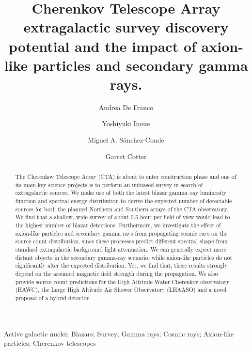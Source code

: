 \documentclass[final,5p]{elsarticle}
\begin{document}
\begin{frontmatter}

\title{Cherenkov Telescope Array extragalactic survey discovery potential and the impact of axion-like particles and secondary gamma rays.}

\author[rvt]{Andrea De Franco}
\author[focal]{Yoshiyuki Inoue}
\author[els]{Miguel A. S\'anchez-Conde}
\author[rvt]{Garret Cotter}
\address[rvt]{University of Oxford, department of Astrophysics, Parks Road,Oxford,UK}
\address[focal]{Institute of Space and Astronautical Science JAXA, 3-1-1 Yoshinodai, Chuo-ku, Sagamihara, Kanagawa 252-5210, Japan}
\address[els]{Oskar Klein Centre for Cosmoparticle Physics, Department of Physics, Stockholm University, SE-10691 Stockholm, Sweden}
\address[els]{Instituto de F\'{\i}sica Te\'orica UAM/CSIC, Universidad Aut\'onoma de Madrid, E-28049 Madrid, Spain}
\address[els]{Departamento de F\'isica Te\'orica, M-15, Universidad Aut\'onoma de Madrid, E-28049 Madrid, Spain}




\begin{abstract}
The Cherenkov Telescope Array (CTA) is about to enter construction phase and one of its main key science projects is to perform an unbiased survey in search of extragalactic sources. We make use of both the latest blazar gamma--ray luminosity function and spectral energy distribution to derive the expected number of detectable sources for both the planned Northern and Southern arrays of the CTA observatory. We find that a shallow, wide survey of about 0.5 hour per field of view would lead to the highest number of blazar detections. Furthermore, we investigate the effect of axion-like particles and secondary gamma rays from propagating cosmic rays on the source count distribution, since these processes predict different spectral shape from standard extragalactic background light attenuation. We can generally expect more distant objects in the secondary gamma-ray scenario, while axion-like particles do not significantly alter the expected distribution. Yet, we find that, these results strongly depend on the assumed magnetic field strength during the propagation. We also provide source count predictions for the High Altitude Water Cherenkov observatory (HAWC), the Large High Altitude Air Shower Observatory (LHAASO) and a novel proposal of a hybrid detector.
\end{abstract}

\begin{keyword}
Active galactic nuclei; Blazars; Survey; Gamma rays; Cosmic rays; Axion-like particles; Cherenkov telescopes
\end{keyword}

\end{frontmatter}
\end{document}
